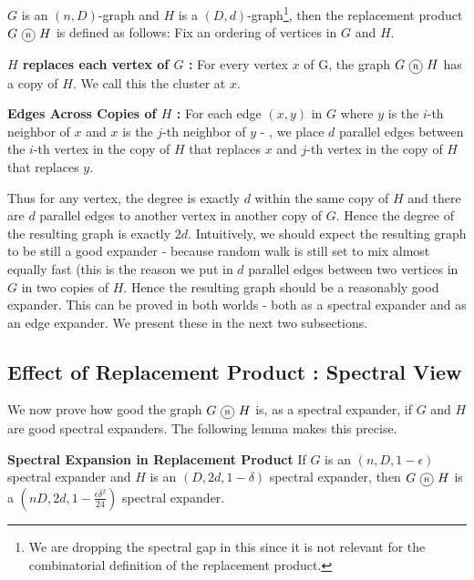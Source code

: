 \begin{definition}
$G$ is an $(n,D)$-graph and $H$ is a $(D,d)$-graph\footnote{We are dropping the spectral gap in this since it is not relevant for the combinatorial definition of the replacement product.}, then the replacement product $G \circled{R} H$ is defined as follows: Fix an ordering of vertices in $G$ and $H$.
\begin{description}
\item{\bf $H$ replaces each vertex of $G$ :} For every vertex $x$ of G, the graph $G \circled{R} H$ has a copy of $H$. We call this the cluster at $x$.
\item{\bf Edges Across Copies of $H$ :}
For each edge $(x,y)$ in $G$ where $y$ is the $i$-th neighbor of $x$ and $x$ is the $j$-th neighbor of $y$ - , we place $d$ parallel edges between the $i$-th vertex in the copy of $H$ that replaces $x$ and $j$-th vertex in the copy of $H$ that replaces $y$. 
\end{description}
\end{definition}

Thus for any vertex, the degree is exactly $d$ within the same copy of $H$ and there are $d$ parallel edges to another vertex in another copy of $G$. Hence the degree of the resulting graph is exactly $2d$.
Intuitively, we should expect the resulting graph to be still a good expander - because random walk is still set to mix almost equally fast (this is the reason we put in $d$ parallel edges between two vertices in $G$ in two copies of $H$. Hence the resulting graph should be a reasonably good expander. This can be proved in both worlds - both as a spectral expander and as an edge expander. We present these in the next two subsections.

\subsection{Effect of Replacement Product : Spectral View}

We now prove how good the graph $G \circled{R} H$ is, as a spectral expander, if $G$ and $H$ are good spectral expanders. The following lemma makes this precise.

\begin{lemma}\textbf{Spectral Expansion in Replacement Product}
If $G$ is an $(n,D,1-\epsilon)$ spectral expander and $H$ is an $(D,2d,1-\delta)$ spectral expander, then $G \circled{R} H$ is a $(nD,2d,1-\frac{\epsilon\delta^2}{24})$ spectral expander.
\end{lemma}

